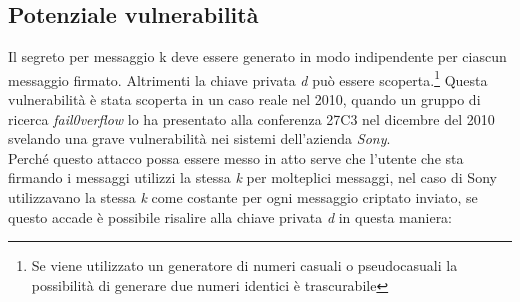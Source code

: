 \documentclass[12pt, a4paper]{report}
\begin{document}
\subsection{Potenziale vulnerabilità}
Il segreto per messaggio k deve essere generato in modo indipendente per ciascun messaggio firmato. Altrimenti la chiave privata \textit{d} può essere scoperta.\footnote{Se viene utilizzato un generatore di numeri casuali o pseudocasuali la possibilità di generare due numeri identici è trascurabile}
Questa vulnerabilità è stata scoperta in un caso reale nel 2010, quando un gruppo di ricerca \textit{fail0verflow} lo ha presentato alla conferenza 27C3 nel dicembre del 2010 svelando una grave vulnerabilità nei sistemi dell'azienda \textit{Sony}.
\\ Perché questo attacco possa essere messo in atto serve che l'utente che sta firmando i messaggi utilizzi la stessa \textit{k} per molteplici messaggi, nel caso di Sony utilizzavano la stessa \textit{k} come costante per ogni messaggio criptato inviato, se questo accade è possibile risalire alla chiave privata \textit{d} in questa maniera:
\end{document}

